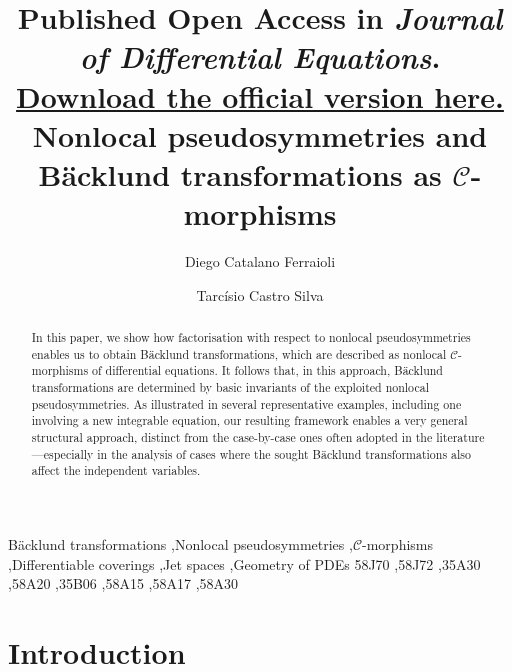 \documentclass[12pt,english]{elsarticle}
\theoremstyle{plain}
\theoremstyle{plain}
\theoremstyle{remark}
\theoremstyle{plain}
\theoremstyle{definition}
\theoremstyle{definition}
\begin{document}
\begin{frontmatter}


\title{\vspace{-2cm} 
    {\footnotesize \textnormal{Published Open Access in \textit{Journal of Differential Equations}. 
    \href{https://doi.org/10.1016/j.jde.2026.114334}{Download the official version here.}}} \\ [1ex]
    Nonlocal pseudosymmetries and Bäcklund transformations as $\mathcal{C}$-morphisms}
    
\author[rvt]{Diego Catalano Ferraioli}
\author[focal]{Tarcísio Castro Silva}
\address[rvt]{Department of Mathematics, Universidade Federal da Bahia, Campus
de Ondina, Av. Milton Santos, S/N, Ondina - CEP 40.170.110 - Salvador,
BA - Brazil, e-mail: diego.catalano@ufba.br.}
\address[focal]{Department of Mathematics, Universidade de Brasilia, Brasilia DF
70910-900, Brazil, e-mail: tarcisiocastro@unb.br. }
\begin{abstract}
In this paper, we show how factorisation with respect to nonlocal
pseudosymmetries enables us to obtain Bäcklund transformations, which
are described as nonlocal $\mathcal{C}$-morphisms of differential
equations. It follows that, in this approach, Bäcklund transformations
are determined by basic invariants of the exploited nonlocal pseudosymmetries.
As illustrated in several representative examples, including one involving
a new integrable equation, our resulting framework enables a very
general structural approach, distinct from the case-by-case ones often
adopted in the literature---especially in the analysis of cases where
the sought Bäcklund transformations also affect the independent variables.
\end{abstract}
\begin{keyword}
Bäcklund transformations \sep Nonlocal pseudosymmetries
\sep  $\mathcal{C}$-morphisms \sep Differentiable coverings \sep Jet spaces \sep Geometry of PDEs  
\MSC[2020] 58J70 \sep 58J72 \sep 35A30  \sep 58A20  \sep  35B06 \sep 58A15 \sep 58A17 \sep 58A30
 
 
\end{keyword}
\end{frontmatter}{}

\medskip{}


\section{Introduction}
\label{sec1}
\end{document}
